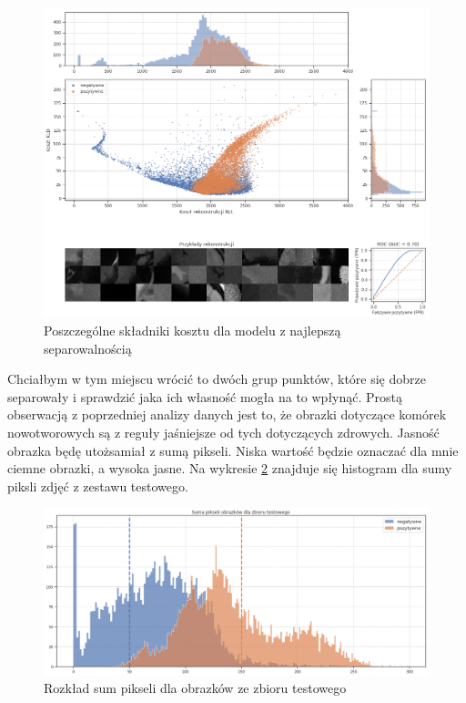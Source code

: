 \begin{figure}[h!]
    \centering
    \includegraphics[width=1.0\textwidth]{images/soft_vae_v2}
    \caption{Poszczególne składniki kosztu dla modelu z najlepszą separowalnością}
    \label{fig:soft_vae}
\end{figure}

Chciałbym w tym miejscu wrócić to dwóch grup punktów, które się dobrze separowały i sprawdzić jaka ich własność mogła na to wpłynąć. Prostą obserwacją z poprzedniej analizy danych jest to, że obrazki dotyczące komórek nowotworowych są z reguły jaśniejsze od tych dotyczących zdrowych. Jasność obrazka będę utożsamiał z sumą pikseli. Niska wartość będzie oznaczać dla mnie ciemne obrazki, a wysoka jasne. Na wykresie \ref{fig:pixels_hist} znajduje się histogram dla sumy piksli zdjęć z zestawu testowego.

\begin{figure}[h!]
    \centering
    \includegraphics[width=1.0\textwidth]{images/pixels_hist_v3}
    \caption{Rozkład sum pikseli dla obrazków ze zbioru testowego}
    \label{fig:pixels_hist}
\end{figure}

